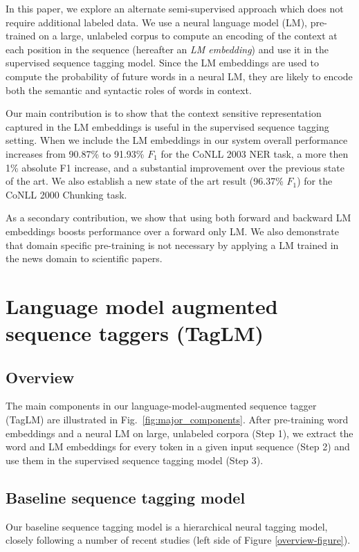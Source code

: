 \documentclass[11pt,a4paper]{article}
\begin{document}
In this paper, we explore an alternate semi-supervised approach which does not require additional labeled data.
We use a neural language model (LM), pre-trained on a large, unlabeled corpus to compute an encoding of the context at each position in the sequence (hereafter an \textit{LM embedding}) and use it in the supervised sequence tagging model.
Since the LM embeddings are used to compute the probability of future words in a neural LM, they are likely to encode both the semantic and syntactic roles of words in context.


Our main contribution is to show that the context sensitive
representation captured in the LM embeddings is useful in the
supervised sequence tagging setting.
When we include the LM embeddings in our system overall performance increases from 90.87\% to 91.93\% $F_1$ for the CoNLL 2003 NER task, a more then 1\% absolute F1 increase,
and a substantial improvement over the previous state of the art.
We also establish
a new state of the art result (96.37\% $F_1$) for the CoNLL 2000 Chunking task.

As a secondary contribution, we show that using both forward and backward LM embeddings boosts performance over a forward only LM. We also demonstrate that domain specific pre-training is not necessary by applying a LM trained in the news domain to scientific papers.





\section{Language model augmented sequence taggers (TagLM)}


\subsection{Overview}
The main components in our language-model-augmented sequence tagger (TagLM) are illustrated in Fig.~\ref{fig:major_components}. 
After pre-training word embeddings and a neural LM on large, unlabeled corpora (Step 1), we extract the word and LM embeddings for every token in a given input sequence (Step 2)
and use them in the supervised sequence tagging model (Step 3).






\subsection{Baseline sequence tagging model}
\label{sec:baseline}
Our baseline sequence tagging model is a hierarchical neural tagging model, closely following a number of recent
studies \citep{Ma2016EndtoendSL,lample-EtAl:2016:N16-1,yang-transfer-iclr07,chiu-nichols-2016} (left side of Figure \ref{overview-figure}).
\end{document}
